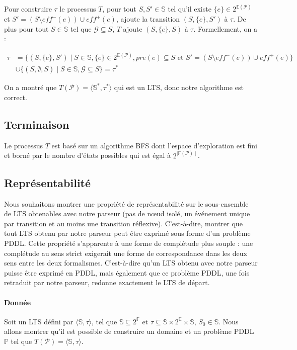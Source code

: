 Pour construire $\tau$ le processus $T$, pour tout $S,S'\in \mathds{S}$ tel qu'il existe $\{e\} \in 2^{\mathds{E}(\mathcal{P})}$ et $S' = (S \setminus eff^-(e)) \cup eff^+(e)$, ajoute la transition $(S,\{e\}, S')$ à $\tau$. De plus pour tout $S\in \mathds{S}$ tel que $\mathcal{G} \subseteq S$, $T$ ajoute $(S,\{e\}, S)$ à $\tau$. Formellement, on a :

\begin{equation*}
    \begin{aligned}
    \tau &= \{(S, \{e\}, S') \mid S \in \mathbb{S}, \{e\} \in 2^{\mathds{E}(\mathcal{P})}, pre(e) \subseteq S \text{ et } S' = (S \setminus eff^-(e)) \cup eff^+(e)\} \\
    &\cup \{(S, \emptyset, S) \mid S \in \mathds{S}, \mathcal{G} \subseteq S\} = \tau^*
    \end{aligned}
\end{equation*}

On a montré que $T(\mathcal{P}) = \langle \mathds{S}^*, \tau^*\rangle$  qui est un LTS, donc notre algorithme est correct.
\subsection{Terminaison}
Le processus $T$ est basé sur un algorithme BFS dont l'espace d'exploration est fini et borné par le nombre d'états possibles qui est égal à $2^{\mid \mathds{F}(\mathcal{P}) \mid}$.


\subsection{Représentabilité}

Nous souhaitons montrer une propriété de représentabilité sur le sous-ensemble de LTS obtenables avec notre parseur (pas de nœud isolé, un événement unique par transition et au moins une transition réflexive). C'est-à-dire, montrer que tout LTS obtenu par notre parseur peut être exprimé sous forme d'un problème PDDL. Cette propriété s'apparente à une forme de complétude plus souple : une complétude au sens strict exigerait une forme de correspondance dans les deux sens entre les deux formalismes. C'est-à-dire qu'un LTS obtenu avec notre parseur puisse être exprimé en PDDL, mais également que ce problème PDDL, une fois retraduit par notre parseur, redonne exactement le LTS de départ. 



\paragraph{Donnée}
Soit un LTS défini par $\langle \mathds{S}, \tau \rangle$, tel que $\mathds{S} \subseteq 2^{\mathds{F}}$ et $\tau \subseteq \mathds{S} \times 2^{\mathds{E}} \times \mathds{S}$, $S_0 \in \mathds{S}$. Nous allons montrer qu'il est possible de construire un domaine et un problème PDDL $\mathds{P}$ tel que $T(\mathcal{P})= \langle \mathds{S}, \tau \rangle$.


